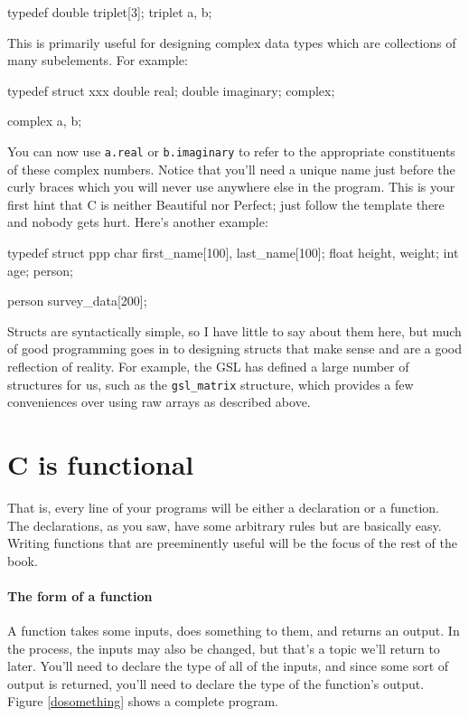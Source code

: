 \documentclass[12pt]{article}
\makeatletter
\def\ttindex#1{\index{#1@{\tt #1}}}
\makeatother
\begin{document}
typedef double triplet[3];
triplet	a, b;

This is primarily useful for designing
complex data types which are collections of many subelements. \ttindex{struct}
For example:

typedef struct xxx{
    double real;
    double imaginary;
} complex;

complex a, b;

You can now use {\tt a.real} or {\tt b.imaginary} to refer to the
appropriate constituents of these complex numbers. Notice that you'll
need a unique name just before the curly braces which you will never
use anywhere else in the program. This is your first hint that C is
neither Beautiful nor Perfect; just follow the template there and nobody
gets hurt. Here's another example:

typedef struct ppp{
    char first_name[100], last_name[100];
    float height, weight;
    int age;
} person;

person survey_data[200];

Structs are syntactically simple, so I have little to say about them here,
but much of good programming goes in to designing structs that make sense
and are a good reflection of reality.  For example, the GSL has defined
a large number of structures for us, such as the {\tt gsl\_matrix}
structure, which provides a few conveniences over using raw arrays as
described above.

\section{C is functional}

That is, every line of your programs will be either a declaration or a
function. The declarations, as you saw, have some arbitrary rules but
are basically easy.  Writing functions that are preeminently useful will
be the focus of the rest of the book.

\paragraph{The form of a function}

A function takes some inputs, does something to them, and returns an
output. In the process, the inputs may also be changed, but that's a
topic we'll return to later.  You'll need to declare the type of all of
the inputs, and since some sort of output is returned, you'll need to
declare the type of the function's output. Figure \ref{dosomething} shows a complete program.
\end{document}
